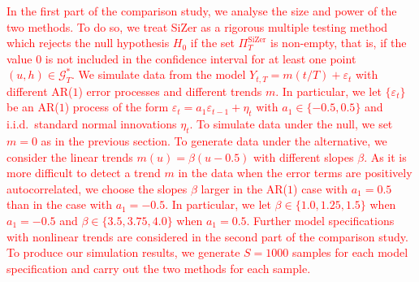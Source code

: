 \textcolor{red}{In the first part of the comparison study, we analyse the size and power of the two methods. To do so, we treat SiZer as a rigorous multiple testing method which rejects the null hypothesis $H_0$ if the set $\Pi_T^{\text{SiZer}}$ is non-empty, that is, if the value $0$ is not included in the confidence interval for at least one point $(u,h) \in \mathcal{G}_T^*$. We simulate data from the model $Y_{t,T} = m(t/T) + \varepsilon_t$ with different AR($1$) error processes and different trends $m$. In particular, we let $\{\varepsilon_t\}$ be an AR($1$) process of the form $\varepsilon_t = a_1 \varepsilon_{t-1} + \eta_t$ with $a_1 \in \{ -0.5,0.5\}$ and i.i.d.\ standard normal innovations $\eta_t$. To simulate data under the null, we set $m = 0$ as in the previous section. To generate data under the alternative, we consider the linear trends $m(u) = \beta (u - 0.5)$ with different slopes $\beta$. As it is more difficult to detect a trend $m$ in the data when the error terms are positively autocorrelated, we choose the slopes $\beta$ larger in the AR($1$) case with $a_1 = 0.5$ than in the case with $a_1 = -0.5$. In particular, we let $\beta \in \{ 1.0,1.25,1.5 \}$ when $a_1 = -0.5$ and $\beta \in \{ 3.5, 3.75, 4.0 \}$ when $a_1 = 0.5$. Further model specifications with nonlinear trends are considered in the second part of the comparison study. To produce our simulation results, we generate $S=1000$ samples for each model specification and carry out the two methods for each sample.} 


